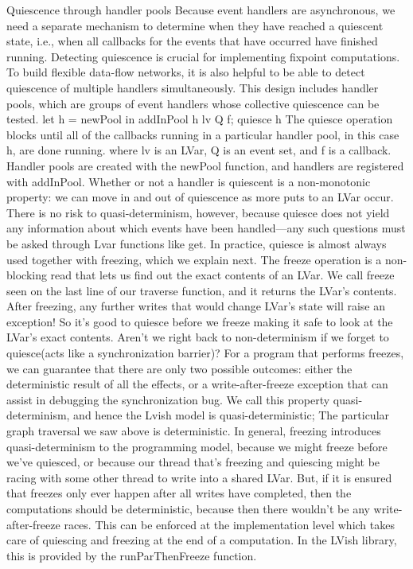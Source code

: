 \documentclass[twocolumn]{article}
\begin{document}
Quiescence through handler pools
Because event handlers are asynchronous, we need a separate mechanism to determine when they have reached a quiescent state, i.e., when all callbacks for the events that have occurred have finished running. Detecting quiescence is crucial for implementing fixpoint computations. To build flexible data-flow networks, it is also helpful to be able to detect quiescence of multiple handlers simultaneously. This design includes handler pools, which are groups of event handlers whose collective quiescence can be tested.
let h = newPool
in addInPool h lv Q f;
quiesce h
The quiesce operation blocks until all of the callbacks running in a particular handler pool, in this case h, are done running. 
where lv is an LVar, Q is an event set, and f is a callback. Handler pools are created with the newPool function, and handlers are registered with addInPool. Whether or not a handler is quiescent is a non-monotonic property: we can move in and out of quiescence as more puts to an LVar occur. There is no risk to quasi-determinism, however, because quiesce does not yield any information about which events have been handled—any such questions must be asked through Lvar functions like get. In practice, quiesce is almost always used together with freezing, which we explain next.
 The freeze operation is a non-blocking read that lets us find out the exact contents of an LVar. We call freeze seen on the last line of our traverse function, and it returns the LVar’s contents.
After freezing, any further writes that would change LVar's state will raise an exception! So it’s good to quiesce before we freeze making it safe to look at the LVar’s exact contents. Aren’t we right back to non-determinism if we forget to quiesce(acts like a synchronization barrier)? For a program that performs freezes, we can guarantee that there are only two possible outcomes: either the deterministic result of all the effects, or a write-after-freeze exception that can assist in debugging the synchronization bug.  We call this property quasi-determinism, and hence the Lvish model is quasi-deterministic; 
The particular graph traversal we saw above is deterministic. In general, freezing introduces quasi-determinism to the programming model, because we might freeze before we’ve quiesced, or because our thread that’s freezing and quiescing might be racing with some other thread to write into a shared LVar.
But, if it is ensured that freezes only ever happen after all writes have completed, then the computations should be deterministic, because then there wouldn’t be any write-after-freeze races. This can be enforced at the implementation level which takes care of quiescing and freezing at the end of a computation. In the LVish library, this is provided by the runParThenFreeze function.
\end{document}
